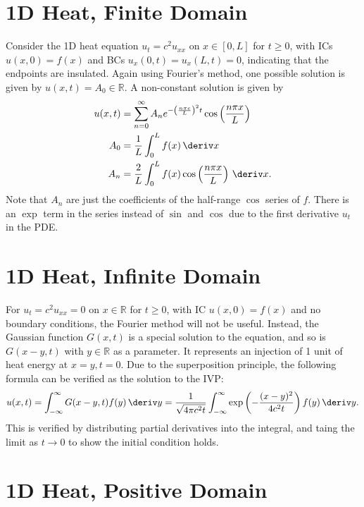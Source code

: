 \documentclass[10pt, a4paper]{article}
\begin{document}
\begin{landscape}
\begin{multicols*}{2}
    \section{1D Heat, Finite Domain}

    Consider the 1D heat equation \(u_t = c^2 u_{xx}\) on \(x \in [0, L]\) for \(t \geq 0\),
    with ICs \(u(x, 0) = f(x)\) and BCs \(u_x(0, t) = u_x(L, t) = 0\), indicating that the endpoints
    are insulated. Again using Fourier's method, one possible solution is given by
    \(u(x, t) = A_0 \in \mathbb{R}\). A non-constant solution is given by
    \begin{align*}
        u(x, t) &= \sum_{n=0}^{\infty} A_n e^{-\left(\frac{n \pi c}{L}\right)^2 t} \cos\left(\frac{n \pi x}{L}\right) \\
        A_0 &= \frac{1}{L} \int_0^L f(x) \,\deriv x \\
        A_n &= \frac{2}{L} \int_0^L f(x) \cos\left(\frac{n \pi x}{L}\right) \,\deriv x.
    \end{align*}
    Note that \(A_n\) are just the coefficients of the half-range \(\cos\) series of \(f\).
    There is an \(\exp\) term in the series instead of \(\sin\) and \(\cos\) due to
    the first derivative \(u_t\) in the PDE.

    \section{1D Heat, Infinite Domain}

    For \(u_t = c^2 u_{xx} = 0\) on \(x \in \mathbb{R}\) for \(t \geq 0\), with IC
    \(u(x, 0) = f(x)\) and no boundary conditions, the Fourier method will not be useful. Instead,
    the Gaussian function \(G(x, t)\) is a special solution to the equation, and so is \(G(x - y, t)\)
    with \(y \in \mathbb{R}\) as a parameter. It represents an injection of 1 unit of heat energy
    at \(x = y, t = 0\). Due to the superposition principle, the following formula can be verified
    as the solution to the IVP:
    \[
        u(x, t)
        = \int_{-\infty}^{\infty} G(x - y, t) f(y) \,\deriv y
        = \frac{1}{\sqrt{4 \pi c^2 t}} \int_{-\infty}^{\infty} \exp\left(-\frac{(x-y)^2}{4c^2 t}\right) f(y) \,\deriv y.
    \]
    This is verified by distributing partial derivatives into the integral, and taing the limit as \(t \to 0\)
    to show the initial condition holds.

    \section{1D Heat, Positive Domain}


\end{multicols*}
\end{landscape}
\end{document}
